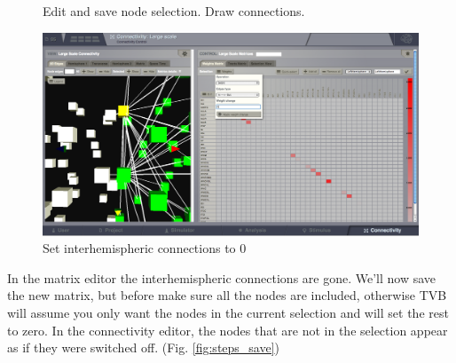 \documentclass{tufte-handout}
\begin{document}
\begin{figure}
  \caption{Edit and save node selection. Draw connections.}
  \label{fig:steps_01_02_03_04}
\end{figure}


\begin{figure}[h]
  \includegraphics[width=\linewidth]{Handout_UI_ModellingStructuralLesions_EdgeOperations}%
  \caption{Set interhemispheric connections to 0}%
  \label{fig:steps_05_06}%
\end{figure}



\noindent In the matrix editor the interhemispheric connections are gone.
We'll now save the new matrix, but before make sure all the nodes are
included, otherwise TVB will assume you only want the nodes in the current
selection and will set the rest to zero. In the connectivity editor, the nodes
that are not in the selection appear as if they were switched off. (Fig. \ref{fig:steps_save})
\end{document}
